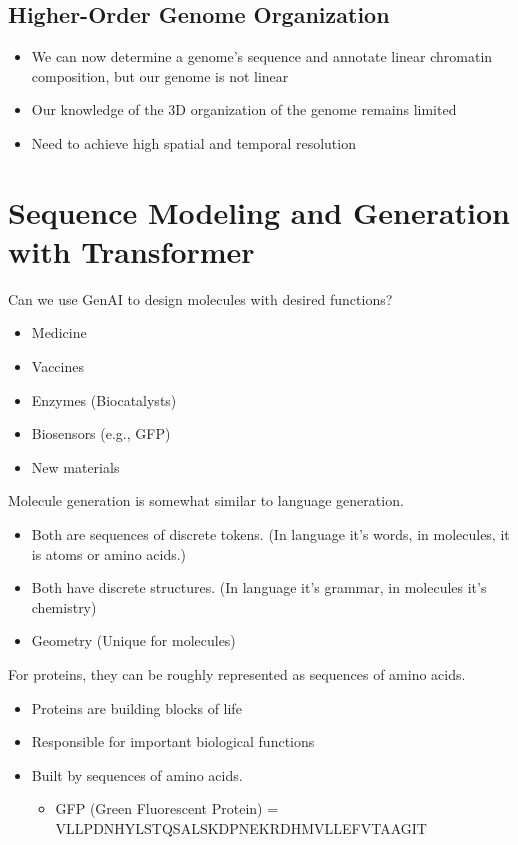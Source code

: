 \documentclass[10pt]{article}
\begin{document}
\subsection*{Higher-Order Genome Organization}
\begin{itemize}
	\item We can now determine a genome's sequence and annotate linear chromatin composition, but our genome is not linear
    \item Our knowledge of the 3D organization of the genome remains limited
    \item Need to achieve high spatial and temporal resolution
\end{itemize}

\section*{Sequence Modeling and Generation with Transformer}
Can we use GenAI to design molecules with desired functions?
\begin{itemize}
	\item Medicine
	\item Vaccines
	\item Enzymes (Biocatalysts)
	\item Biosensors (e.g., GFP)
	\item New materials
\end{itemize}
Molecule generation is somewhat similar to language generation.
\begin{itemize}
	\item Both are sequences of discrete tokens.  (In language it's words, in molecules, it is atoms or amino acids.)
	\item Both have discrete structures.  (In language it's grammar, in molecules it's chemistry)
	\item Geometry (Unique for molecules)
\end{itemize}
For proteins, they can be roughly represented as sequences of amino acids.
\begin{itemize}
	\item Proteins are building blocks of life
	\item Responsible for important biological functions
	\item Built by sequences of amino acids.
	\begin{itemize}
	    \item GFP (Green Fluorescent Protein) = VLLPDNHYLSTQSALSKDPNEKRDHMVLLEFVTAAGIT
    \end{itemize}
\end{itemize}
\end{document}
